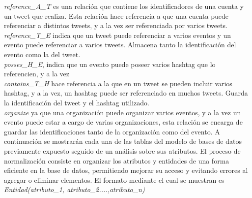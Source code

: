 \documentclass{memoria}
\begin{document}
\textit{reference\_A\_T} es una relación que contiene los identificadores de una cuenta y un tweet que realiza. Esta relación hace referencia a que una cuenta puede referenciar a distintos tweets, y a la vez ser referenciada por varios tweets.\\
\textit{reference\_T\_E} indica que un tweet puede referenciar a varios eventos y un evento puede referenciar a varios tweets. Almacena tanto la identificación del evento como la del tweet.\\
\textit{posses\_H\_E}, indica que un evento puede poseer varios hashtag que lo referencien, y a la vez \\
\textit{contains\_T\_H} hace referencia a la que en un tweet se pueden incluir varios hashtag, y a la vez, un hashtag puede ser referenciado en muchos tweets. Guarda la identificación del tweet y el hashtag utilizado.\\
\textit{organize} ya que una organización puede organizar varios eventos, y a la vez un evento puede estar a cargo de varias organizaciones, esta relación se encarga de guardar las identificaciones tanto de la organización como del evento.
\newpage
{}
A continuación se mostrarán cada una de las tablas del modelo de bases de datos previamente expuesto seguido de un análisis sobre sus atributos. El proceso de normalización consiste en organizar los atributos y entidades de una forma eficiente en la base de datos, permitiendo mejorar su acceso y evitando errores al agregar o eliminar elementos. El formato mediante el cual se muestran es \textit{Entidad(atributo\_1, atributo\_2....,atributo\_n)}
\end{document}
